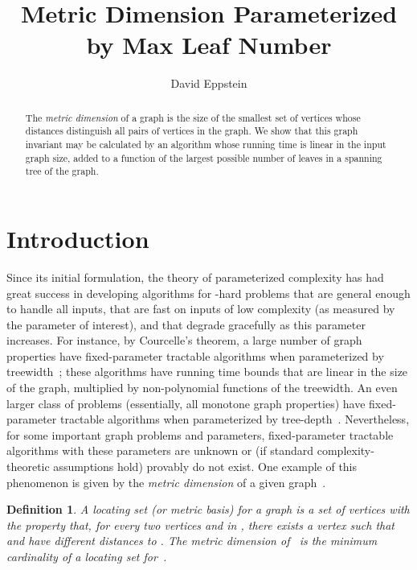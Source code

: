 \documentclass{jgaa-art}
\title{Metric Dimension Parameterized\\ by Max Leaf Number}
\author{David Eppstein}{eppstein@uci.edu}
\affiliation{Department of Computer Science, University of California, Irvine}
\newtheorem{definition}{Definition}
\begin{document}
\maketitle

\begin{abstract}
The \emph{metric dimension} of a graph is the size of the smallest set of vertices whose distances distinguish all pairs of vertices in the graph. We show that this graph invariant may be calculated by an algorithm whose running time is linear in the input graph size, added to a function of the largest possible number of leaves in a spanning tree of the graph.
\end{abstract}

\section{Introduction}

Since its initial formulation, the theory of parameterized complexity has had great success in developing algorithms for -hard problems that are general enough to handle all inputs, that are fast on inputs of low complexity (as measured by the parameter of interest), and that degrade gracefully as this parameter increases. For instance, by Courcelle's theorem, a large number of graph properties have fixed-parameter tractable algorithms when parameterized by treewidth~\cite{Cou-IC-90}; these algorithms have running time bounds that are linear in the size of the graph, multiplied by non-polynomial functions of the treewidth. An even larger class of problems (essentially, all monotone graph properties) have fixed-parameter tractable algorithms when parameterized by tree-depth~\cite{NesOss-12}.
Nevertheless, for some important graph problems and parameters, fixed-parameter tractable algorithms with these parameters are unknown or (if standard complexity-theoretic assumptions hold) provably do not exist.  One example of this phenomenon is given by the \emph{metric dimension} of a given graph~\cite{HarMel-AC-76}.

\begin{definition}
A  \emph{locating set} (or \emph{metric basis}) for a graph  is a set  of vertices with the property that, for every two vertices  and  in , there exists a vertex  such that  and  have different distances to . The \emph{metric dimension} of~ is the minimum cardinality of a locating set for~.
\end{definition}
\end{document}
